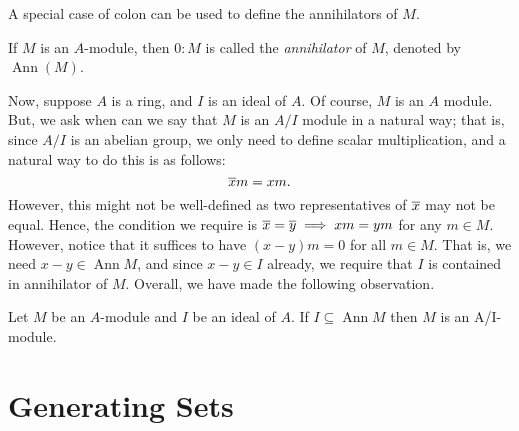 A special case of colon can be used to define the annihilators of $M$.
\begin{definition}[Annihilator]
   If $M$ is an $A$-module, then $0: M$ is called the {\it annihilator} of $M$, denoted by $\operatorname{Ann}(M)$. 
\end{definition}

Now, suppose $A$ is a ring, and $I$ is an ideal of $A$. Of course, $M$ is an $A$ module. But, we ask when can we say that $M$ is an $A / I$ module in a natural way; that is, since $A/I$ is an abelian group, we only need to define scalar multiplication, and a natural way to do this is as follows: 
\[\overline{x} m=x m.\]
However, this  might not be well-defined as two representatives of $\overline{x}$ may not be equal. Hence, the condition we require is $\overline{x}=\overline{y} \implies x m=y m$ for any $m \in M$. However, notice that it suffices to have $(x-y) m=0$ for all $m \in M$. That is, we need $x-y \in \operatorname{Ann} M$, and since $x-y \in I$ already, we require that $I$ is contained in annihilator of $M$. Overall, we have made the following observation.
\begin{observation}
    Let $M$ be an $A$-module and $I$ be an ideal of $A$. If $I \subseteq \operatorname{Ann}M$ then $M$ is an A/I-module. 
\end{observation}

\section{Generating Sets}

